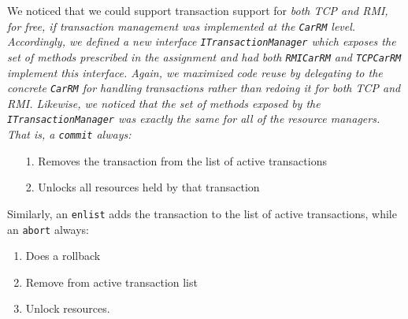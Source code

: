 \documentclass[a4paper]{article}
\begin{document}
We noticed that we could support transaction support for \it both \rm TCP and RMI, \emph{for free}, if transaction management was implemented at the \texttt{CarRM} level. Accordingly, we defined a new interface \texttt{ITransactionManager} which 
exposes the set of methods prescribed in the assignment and had both \texttt{RMICarRM} and \texttt{TCPCarRM} implement this interface. Again, we maximized code reuse by delegating to the concrete \texttt{CarRM} for handling transactions
rather than redoing it for both TCP and RMI. Likewise, we noticed that the set of methods exposed by the \texttt{ITransactionManager} was exactly the same for all of the resource managers. That is, a \texttt{commit} always:
\begin{enumerate}
 \item[1.] Removes the transaction from the list of active transactions 
 \item[2.] Unlocks all resources held by that transaction
\end{enumerate}
Similarly, an \texttt{enlist} adds the transaction to the list of active transactions, while an \texttt{abort} always:
\begin{enumerate}
\item Does a rollback
\item Remove from active transaction list
\item Unlock resources.
\end{enumerate}
\end{document}
